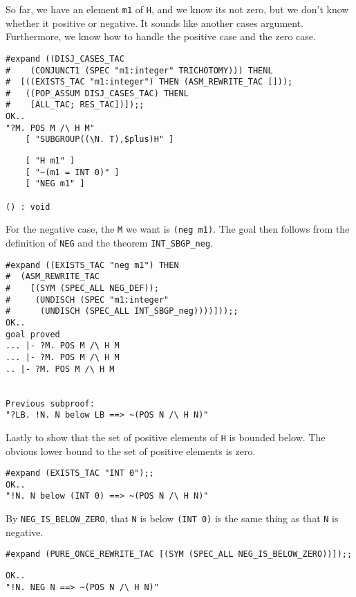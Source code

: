 So far, we have an element {\small\verb+m1+} of {\small\tt H}, and we
know its not zero, but we don't know whether it positive or negative.
It sounds like another cases argument.  Furthermore, we know how to
handle the positive case and the zero case.
\begin{session}
\begin{verbatim}
#expand ((DISJ_CASES_TAC
#    (CONJUNCT1 (SPEC "m1:integer" TRICHOTOMY))) THENL
#  [((EXISTS_TAC "m1:integer") THEN (ASM_REWRITE_TAC []));
#   ((POP_ASSUM DISJ_CASES_TAC) THENL
#    [ALL_TAC; RES_TAC])]);;
OK..
"?M. POS M /\ H M"
    [ "SUBGROUP((\N. T),$plus)H" ]
\end{verbatim}
\mvdots
\begin{verbatim}
    [ "H m1" ]
    [ "~(m1 = INT 0)" ]
    [ "NEG m1" ]

() : void
\end{verbatim}
\end{session}

For the negative case, the {\small\tt M} we want is {\small\verb+(neg m1)+}.
The goal then follows from the definition of {\small\verb+NEG+} and
the theorem {\small\verb+INT_SBGP_neg+}.
\begin{session}
\begin{verbatim}
#expand ((EXISTS_TAC "neg m1") THEN
#  (ASM_REWRITE_TAC
#    [(SYM (SPEC_ALL NEG_DEF));
#     (UNDISCH (SPEC "m1:integer"
#      (UNDISCH (SPEC_ALL INT_SBGP_neg))))]));;
OK..
goal proved
... |- ?M. POS M /\ H M
... |- ?M. POS M /\ H M
.. |- ?M. POS M /\ H M


Previous subproof:
"?LB. !N. N below LB ==> ~(POS N /\ H N)"
\end{verbatim}
\evdots
\end{session}

Lastly to show that the set of positive elements of {\small\tt H} is
bounded below.  The obvious lower bound to the set of positive
elements is zero.
\begin{session}
\begin{verbatim}
#expand (EXISTS_TAC "INT 0");;
OK..
"!N. N below (INT 0) ==> ~(POS N /\ H N)"
\end{verbatim}
\evdots
\end{session}

By {\small\verb+NEG_IS_BELOW_ZERO+}, that {\small\tt N} is below
{\small\verb+(INT 0)+} is the same thing as that {\small\tt N} is
negative.
\begin{session}
\begin{verbatim}
#expand (PURE_ONCE_REWRITE_TAC [(SYM (SPEC_ALL NEG_IS_BELOW_ZERO))]);;
\end{verbatim}
\mvdots
\begin{verbatim}
OK..
"!N. NEG N ==> ~(POS N /\ H N)"
\end{verbatim}
\evdots
\end{session}

